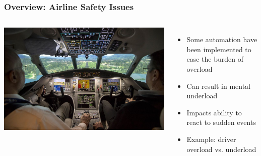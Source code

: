 \documentclass{beamer}
\begin{document}
\begin{frame}
\frametitle{Overview: Airline Safety Issues}
\begin{columns}[c]
\includegraphics[width=\textwidth]{flight}
\begin{itemize}
\item{Some automation have been implemented to ease the burden of overload}
\item{Can result in mental underload}
\item{Impacts ability to react to sudden events}
\item{Example: driver overload vs. underload}
\end{itemize}
\end{columns}
\end{frame}
\end{document}
